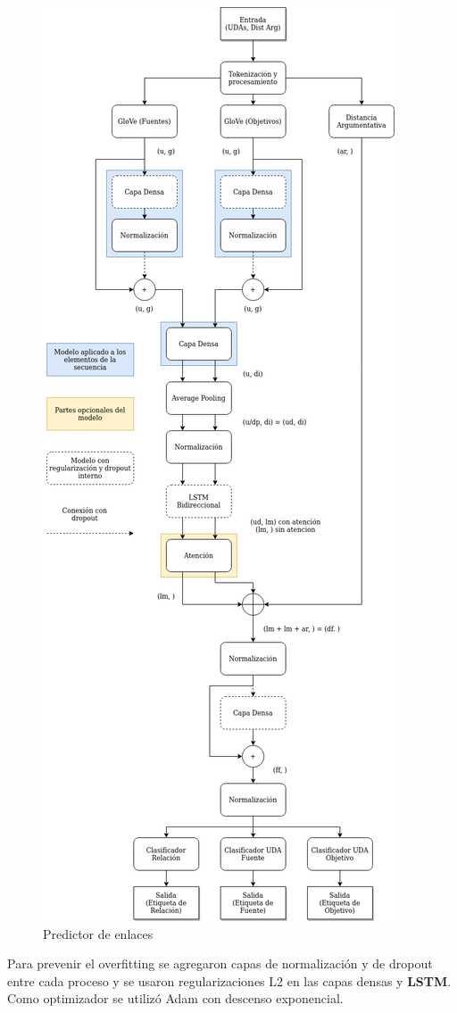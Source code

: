\begin{figure}[h!]
	\begin{center}
		\begin{center}
			\includegraphics[scale=.3]{Graphics/Modelo_Link_Prediction.png}
        \end{center}
	    \caption{Predictor de enlaces}\label{fig:link_predictor}
	\end{center}
\end{figure}

Para prevenir el overfitting se agregaron capas de normalización y de dropout entre cada proceso y se usaron regularizaciones
L2 en las capas densas y \textbf{LSTM}. Como optimizador se utilizó Adam con descenso exponencial.

